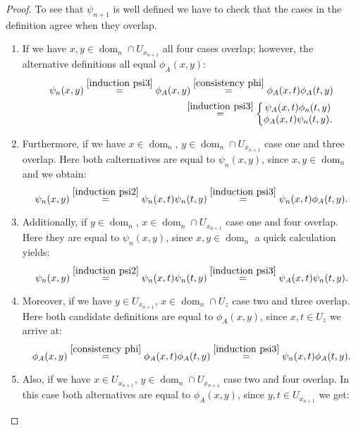 \documentclass[b5paper,draft,openbib,12pt]{memoir}
\DeclareMathOperator{\dom}{dom}
\begin{document}
\begin{proof}
To see that \(\psi_{n+1}\) is well defined we have to check 
that the cases in the definition agree when they overlap. 
\begin{enumerate}
  \item If we have \(x,y \in \dom_n\cap U_{x_{n+1}}\) all four cases overlap; however, the 
  alternative definitions all equal \(\phi_A(x,y)\):
\begin{align}\nonumber
  \psi_n(x,y)\overset{\eqref{induction psi3}}{=}\phi_A(x,y)\overset{\eqref{consistency phi}}{=}\phi_A(x,t) \phi_A(t,y)
  \\
\overset{\eqref{induction psi3}}{=}\left\{\begin{matrix}\psi_A(x,t) \phi_n(t,y)\\ \phi_A(x,t) \psi_n(t,y).\end{matrix}\right.
  \end{align}
  \item Furthermore, if we have \(x\in \dom_n\), \(y\in \dom_n\cap U_{x_{n+1}}\) case one 
  and three overlap. Here both calternatives are equal to
  \(\psi_n(x,y)\), since \(x,y\in \dom_n\) and we obtain:
  \begin{equation}
  \psi_n(x,y)\overset{\eqref{induction psi2}}{=}\psi_n(x,t)\psi_n(t,y)\overset{\eqref{induction psi3}}{=}\psi_n(x,t)\phi_A(t,y).
  \end{equation}
  \item Additionally, if \(y\in \dom_n\), \(x\in \dom_n\cap U_{x_{n+1}}\) case one and four overlap. 
  Here they are equal to
  \(\psi_n(x,y)\), since \(x,y\in \dom_n\) a quick calculation yields:
  \begin{equation}
  \psi_n(x,y)\overset{\eqref{induction psi2}}{=}\psi_n(x,t)\psi_n(t,y)\overset{\eqref{induction psi3}}{=}\psi_A(x,t)\psi_n(t,y).
  \end{equation}
  \item Moreover, if we have \(y\in U_{x_{n+1}}\), \(x\in \dom_n\cap U_z\) 
  case two and three overlap. Here both candidate definitions are equal to
  \(\phi_A(x,y)\), since \(x,t\in U_z\) we arrive at:
  \begin{equation}
  \phi_A(x,y)\overset{\eqref{consistency phi}}{=}\phi_A(x,t)\phi_A(t,y)\overset{\eqref{induction psi3}}{=}\psi_n(x,t)\phi_A(t,y).
  \end{equation}
  \item Also, if we have \(x\in U_{x_{n+1}}\), \(y\in \dom_n\cap U_{x_{n+1}}\) 
  case two and four overlap. In this case both alternatives are equal to
  \(\phi_A(x,y)\), since \(y,t\in U_{x_{n+1}}\) we get:

\end{enumerate}
\end{proof}
\end{document}
